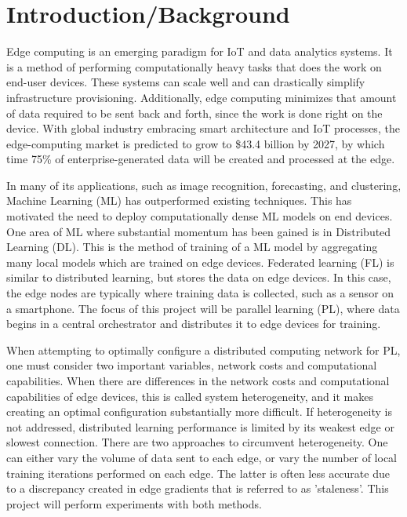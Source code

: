 \documentclass[../mthe-493-project-proposal.tex]{subfiles}
\begin{document}
    \chapter{Introduction/Background}
    \label{ch:introduction}

    Edge computing is an emerging paradigm for IoT and data analytics systems. It is a method of performing computationally heavy tasks that does the work on end-user devices. These systems can scale well and can drastically simplify infrastructure provisioning. Additionally, edge computing minimizes that amount of data required to be sent back and forth, since the work is done right on the device. With global industry embracing smart architecture and IoT processes, the edge-computing market is predicted to grow to \$43.4 billion by 2027, by which time 75\% of enterprise-generated data will be created and processed at the edge.~\cite{noauthor_edge_2020}
    
    In many of its applications, such as image recognition, forecasting, and clustering, Machine Learning (ML) has outperformed existing techniques. This has motivated the need to deploy computationally dense ML models on end devices. One area of ML where substantial momentum has been gained is in Distributed Learning (DL). This is the method of training of a ML model by aggregating many local models which are trained on edge devices. Federated learning (FL) is similar to distributed learning, but stores the data on edge devices. In this case, the edge nodes are typically where training data is collected, such as a sensor on a smartphone. The focus of this project will be parallel learning (PL), where data begins in a central orchestrator and distributes it to edge devices for training.
    
    When attempting to optimally configure a distributed computing network for PL, one must consider two important variables, network costs and computational capabilities. When there are differences in the network costs and computational capabilities of edge devices, this is called system heterogeneity, and it makes creating an optimal configuration substantially more difficult. If heterogeneity is not addressed, distributed learning performance is limited by its weakest edge or slowest connection. There are two approaches to circumvent heterogeneity. One can either vary the volume of data sent to each edge, or vary the number of local training iterations performed on each edge. The latter is often less accurate due to a discrepancy created in edge gradients that is referred to as 'staleness'. This project will perform experiments with both methods.
    
\end{document}
